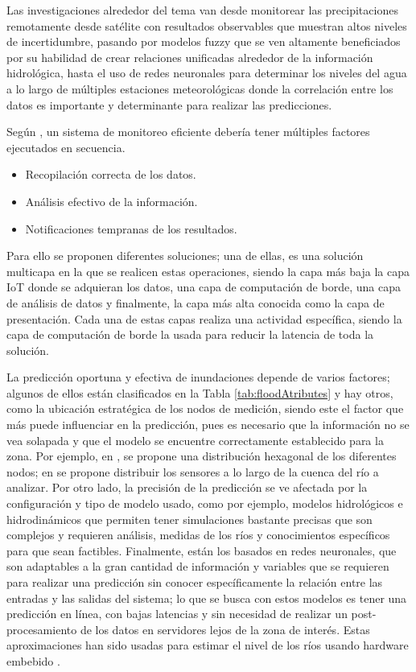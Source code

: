 Las investigaciones alrededor del tema van desde monitorear las precipitaciones remotamente desde satélite\cite{remoteSatellite,advancedForecast} con resultados observables que muestran altos niveles de incertidumbre, pasando por modelos fuzzy que se ven altamente beneficiados por su habilidad de crear relaciones unificadas alrededor de la información hidrológica, hasta el uso de redes neuronales para determinar los niveles del agua a lo largo de múltiples estaciones meteorológicas donde la correlación entre los datos es importante y determinante para realizar las predicciones\cite{Nguyen2014,floodfc1,floodfc2,floodfc3,floodfc4}.

Según \citep{floodAtributes}, un sistema de monitoreo eficiente debería tener múltiples factores ejecutados en secuencia.
\begin{itemize}
\item Recopilación correcta de los datos.
\item Análisis efectivo de la información.
\item Notificaciones tempranas de los resultados.
\end{itemize}

Para ello se proponen diferentes soluciones; una de ellas, es una solución multicapa en la que se realicen estas operaciones, siendo la capa más baja la capa IoT donde se adquieran los datos, una capa de computación de borde, una capa de análisis de datos y finalmente, la capa más alta conocida como la capa de presentación. Cada una de estas capas realiza una actividad específica, siendo la capa de computación de borde la usada para reducir la latencia de toda la solución.

La predicción oportuna y efectiva de inundaciones depende de varios factores; algunos de ellos están clasificados en la Tabla \ref{tab:floodAtributes} y hay otros, como la ubicación estratégica de los nodos de medición, siendo este el factor que más puede influenciar en la predicción, pues es necesario que la información no se vea solapada y que el modelo se encuentre correctamente establecido para la zona. Por ejemplo, en \citep{floodAtributes}, se propone una distribución hexagonal de los diferentes nodos; en \citep{floodfc3} se propone distribuir los sensores a lo largo de la cuenca del río a analizar. Por otro lado, la precisión de la predicción se ve afectada por la configuración y tipo de modelo usado, como por ejemplo, modelos hidrológicos e hidrodinámicos que permiten tener simulaciones bastante precisas \citep{merkuryeva2015advanced,ANN3} que son complejos y requieren análisis, medidas de los ríos y conocimientos específicos para que sean factibles. Finalmente, están los basados en redes neuronales, que son adaptables a la gran cantidad de información y variables que se requieren para realizar una predicción sin conocer específicamente la relación entre las entradas y las salidas del sistema; lo que se busca con estos modelos es tener una predicción en línea, con bajas latencias y sin necesidad de realizar un post-procesamiento de los datos en servidores lejos de la zona de interés. Estas aproximaciones han sido usadas para estimar el nivel de los ríos usando hardware embebido \cite{ANN1,ANN2,ANN3,ANN4,ANN5,ANN6,ANN7}.

